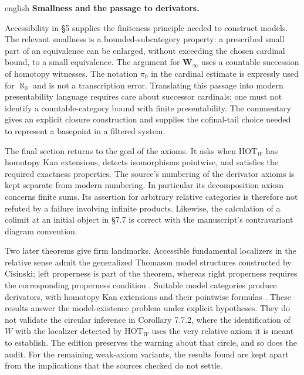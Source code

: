 \begin{otherlanguage*}{english}
\medskip\noindent\textbf{Smallness and the passage to derivators.}

Accessibility in \S5 supplies the finiteness principle needed to construct models. The relevant smallness is a bounded-subcategory property: a prescribed small part of an equivalence can be enlarged, without exceeding the chosen cardinal bound, to a small equivalence. The argument for $\mathbf W_\infty$ uses a countable succession of homotopy witnesses. The notation $\pi_0$ in the cardinal estimate is expressly used for $\aleph_0$ and is not a transcription error. Translating this passage into modern presentability language requires care about successor cardinals; one must not identify a countable-category bound with finite presentability. The commentary gives an explicit closure construction and supplies the cofinal-tail choice needed to represent a basepoint in a filtered system.

The final section returns to the goal of the axioms. It asks when $\mathrm{HOT}_W$ has homotopy Kan extensions, detects isomorphisms pointwise, and satisfies the required exactness properties. The source's numbering of the derivator axioms is kept separate from modern numbering. In particular its decomposition axiom concerns finite sums. Its assertion for arbitrary relative categories is therefore not refuted by a failure involving infinite products. Likewise, the calculation of a colimit at an initial object in \S7.7 is correct with the manuscript's contravariant diagram convention.

Two later theorems give firm landmarks. Accessible fundamental localizers in the relative sense admit the generalized Thomason model structures constructed by Cisinski; left properness is part of the theorem, whereas right properness requires the corresponding properness condition \citep[Theorem 5.2.15]{Cisinski2006}. Suitable model categories produce derivators, with homotopy Kan extensions and their pointwise formulas \citep{Cisinski2003,Groth2013}. These results answer the model-existence problem under explicit hypotheses. They do not validate the circular inference in Corollary 7.7.2, where the identification of $W$ with the localizer detected by $\mathrm{HOT}_W$ uses the very relative axiom it is meant to establish. The edition preserves the warning about that circle, and so does the audit. For the remaining weak-axiom variants, the results found are kept apart from the implications that the sources checked do not settle.


\end{otherlanguage*}
